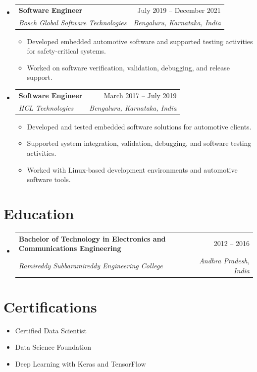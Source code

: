 \documentclass[11pt,a4paper]{article}
\makeatletter
\newcommand{\resumeItem}[1]{\item\small{#1}}
\newcommand{\resumeSubheading}[4]{
  \vspace{-1pt}\item
    \begin{tabular*}{\textwidth}{l@{\extracolsep{\fill}}r}
      \textbf{#1} & #2 \\
      \textit{\small#3} & \textit{\small #4} \\
    \end{tabular*}\vspace{-5pt}
}
\makeatother
\begin{document}
\begin{itemize}[leftmargin=0.15in]
\resumeSubheading
{Software Engineer}{July 2019 -- December 2021}
{Bosch Global Software Technologies}{Bengaluru, Karnataka, India}
\vspace{4pt}
\begin{itemize}
    \resumeItem{Developed embedded automotive software and supported testing activities for safety-critical systems.}
    \resumeItem{Worked on software verification, validation, debugging, and release support.}
\end{itemize}
\vspace{10pt}

\resumeSubheading
{Software Engineer}{March 2017 -- July 2019}
{HCL Technologies}{Bengaluru, Karnataka, India}
\vspace{4pt}
\begin{itemize}
    \resumeItem{Developed and tested embedded software solutions for automotive clients.}
    \resumeItem{Supported system integration, validation, debugging, and software testing activities.}
    \resumeItem{Worked with Linux-based development environments and automotive software tools.}
\end{itemize}
\vspace{10pt}

\end{itemize}

\section{Education}

\begin{itemize}[leftmargin=0.15in]
\resumeSubheading
{Bachelor of Technology in Electronics and Communications Engineering}{2012 -- 2016}
{Ramireddy Subbaramireddy Engineering College}{Andhra Pradesh, India}

\end{itemize}

\section{Certifications}
\begin{itemize}[leftmargin=0.15in]
    \item Certified Data Scientist
    \item Data Science Foundation
    \item Deep Learning with Keras and TensorFlow
\end{itemize}
\end{document}
